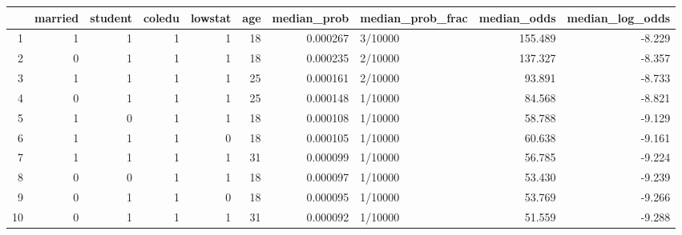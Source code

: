 \begin{table}[ht]
\centering
\begin{tabular}{rrrrrrrlrr}
  \hline
 & married & student & coledu & lowstat & age & median\_prob & median\_prob\_frac & median\_odds & median\_log\_odds \\ 
  \hline
1 &       1 &       1 &       1 &       1 &      18 & 0.000267 & 3/10000 & 155.489 & -8.229 \\ 
  2 &       0 &       1 &       1 &       1 &      18 & 0.000235 & 2/10000 & 137.327 & -8.357 \\ 
  3 &       1 &       1 &       1 &       1 &      25 & 0.000161 & 2/10000 & 93.891 & -8.733 \\ 
  4 &       0 &       1 &       1 &       1 &      25 & 0.000148 & 1/10000 & 84.568 & -8.821 \\ 
  5 &       1 &       0 &       1 &       1 &      18 & 0.000108 & 1/10000 & 58.788 & -9.129 \\ 
  6 &       1 &       1 &       1 &       0 &      18 & 0.000105 & 1/10000 & 60.638 & -9.161 \\ 
  7 &       1 &       1 &       1 &       1 &      31 & 0.000099 & 1/10000 & 56.785 & -9.224 \\ 
  8 &       0 &       0 &       1 &       1 &      18 & 0.000097 & 1/10000 & 53.430 & -9.239 \\ 
  9 &       0 &       1 &       1 &       0 &      18 & 0.000095 & 1/10000 & 53.769 & -9.266 \\ 
  10 &       0 &       1 &       1 &       1 &      31 & 0.000092 & 1/10000 & 51.559 & -9.288 \\ 
   \hline
\end{tabular}
\end{table}
